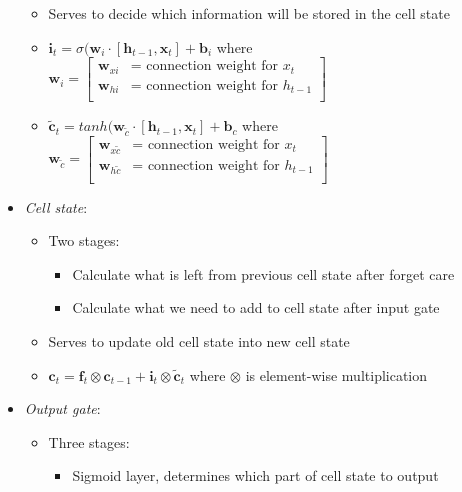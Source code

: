\begin{itemize}
\begin{itemize}
\begin{itemize}
        \end{itemize}
        \item Serves to decide which information will be stored in the cell state
        \item $\boldsymbol{i}_t = \sigma (\boldsymbol{w}_i \cdot [ \boldsymbol{h}_{t-1}, \boldsymbol{x}_t ] + \boldsymbol{b}_i $ where $\boldsymbol{w}_i = \begin{bmatrix}
        \boldsymbol{w}_{xi} & \textrm{= connection weight for } x_t \\
        \boldsymbol{w}_{hi} & \textrm{= connection weight for } h_{t-1} \\
        \end{bmatrix}$
        \item $\boldsymbol{\tilde{c}}_t = tanh (\boldsymbol{w}_{\tilde{c}} \cdot [ \boldsymbol{h}_{t-1}, \boldsymbol{x}_t ] + \boldsymbol{b}_c $ where $\boldsymbol{w}_{\tilde{c}} = \begin{bmatrix}
        \boldsymbol{w}_{x{\tilde{c}}} & \textrm{= connection weight for } x_t \\
        \boldsymbol{w}_{h{\tilde{c}}} & \textrm{= connection weight for } h_{t-1} \\
        \end{bmatrix}$
    \end{itemize}
    \item \emph{Cell state}:
    \begin{itemize}
        \item Two stages:
        \begin{itemize}
            \item Calculate what is left from previous cell state after forget care
            \item Calculate what we need to add to cell state after input gate
        \end{itemize}
        \item Serves to update old cell state into new cell state
        \item $\boldsymbol{c}_t = \boldsymbol{f}_t \otimes \boldsymbol{c}_{t-1} + \boldsymbol{i}_t \otimes \boldsymbol{\tilde{c}}_{t}$ where $\otimes$ is element-wise multiplication
    \end{itemize}
    \item \emph{Output gate}:
    \begin{itemize}
        \item Three stages:
        \begin{itemize}
            \item Sigmoid layer, determines which part of cell state to output

\end{itemize}
\end{itemize}
\end{itemize}
